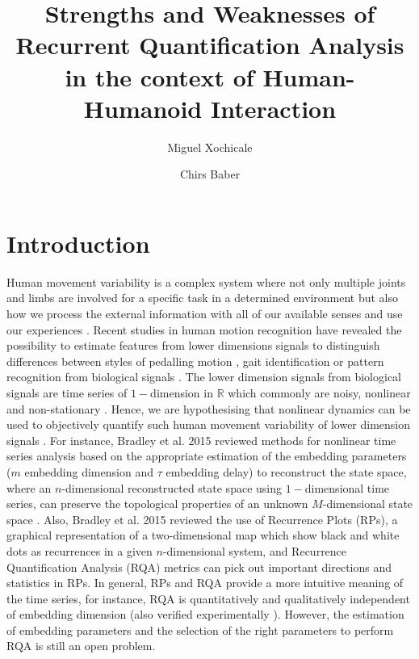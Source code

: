 \documentclass[fleqn,10pt]{wlscirep}
\title{Strengths and Weaknesses of Recurrent Quantification Analysis 
in the context of Human-Humanoid Interaction}
\author[1,*]{Miguel Xochicale}
\author[1]{Chirs Baber}
\affil[1]{University of Birmingham, 
	School of Engineering, 
	Birmingham, 
	B15 2TT, 
	UK}
\affil[*]{map479@bham.ac.uk}
\begin{document}
\flushbottom
\maketitle
\thispagestyle{empty}


\section*{Introduction}
Human movement variability is a complex system where not only multiple
joints and limbs are involved for a specific task in a determined environment
but also how we process the external information with all of our available senses 
and use our experiences \cite{davids2003}. 
Recent studies in human motion recognition have revealed the possibility to 
estimate features from lower dimensions signals to distinguish differences between 
styles of pedalling motion \cite{Quintana-Duque2012, Quintana-Duque2016}, 
gait identification \cite{sama2013, frank2010} 
or pattern recognition from biological signals \cite{gomezgarcia2014}.
The lower dimension signals from biological signals are time series 
of $1-$dimension in $\mathbb{R}$ which commonly are 
noisy, nonlinear and non-stationary \cite{gomezgarcia2014}.
Hence, we are hypothesising that nonlinear dynamics can be used to 
objectively quantify such human movement variability of lower
dimension signals \cite{Quintana-Duque2012, Quintana-Duque2016, sama2013, 
frank2010, gomezgarcia2014, marwan2011, stergiou2011}.
For instance, Bradley et al. 2015 \cite{bradley2015} reviewed methods for
nonlinear time series analysis based on the appropriate estimation of the 
embedding parameters ($m$ embedding dimension and $\tau$ embedding delay) to 
reconstruct the state space,
where an $n$-dimensional reconstructed state space using $1-$dimensional 
time series,
can preserve the topological properties of an unknown $M$-dimensional 
state space \cite{takens1981}.
Also, Bradley et al. 2015 \cite{bradley2015} reviewed the use of 
Recurrence Plots (RPs), a graphical representation of a two-dimensional map 
which show black and white dots as recurrences in a given $n$-dimensional system, 
and Recurrence Quantification Analysis (RQA) metrics can pick out important 
directions and statistics in RPs.
In general, RPs and RQA provide a more intuitive meaning of the time series,
for instance, RQA is quantitatively and qualitatively independent of 
embedding dimension (also verified experimentally \cite{iwanski1998}).
However, the estimation of embedding parameters and the selection of the 
right parameters to perform RQA is still an open problem.
\end{document}

